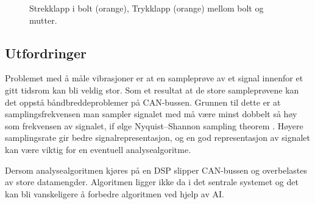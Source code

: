 \begin{figure}[H]
\hfill
{}
\caption{\protect{\ref{fig:Strekklapp_vector}} Strekklapp i bolt (orange), \protect{\ref{fig:Trykklapp_vector}} Trykklapp (orange) mellom bolt og mutter.}
\end{figure}

\subsection{Utfordringer}

Problemet med å måle vibrasjoner er at en sampleprøve av et signal innenfor et gitt tidsrom kan bli veldig stor. Som
et resultat at de store sampleprøvene kan det oppstå båndbreddeproblemer på CAN-bussen. Grunnen til dette
er at samplingsfrekvensen man sampler signalet med må være
minst dobbelt så høy som frekvensen av signalet, if ølge Nyquist–Shannon sampling theorem \cite{nyquist}. Høyere
samplingsrate gir bedre signalrepresentasjon, og en god
representasjon av signalet kan være viktig for en eventuell analysealgoritme.

Dersom analysealgoritmen kjøres på en DSP slipper CAN-bussen og overbelastes av store datamengder.
Algoritmen ligger ikke da i det sentrale systemet og det kan bli vanskeligere å forbedre algoritmen ved hjelp av AI.
